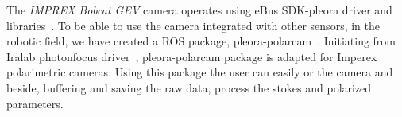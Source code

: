 The \textit{IMPREX Bobcat GEV} camera operates using eBus SDK-pleora driver and
libraries~\cite{eBus}. To be able to use the camera integrated with other
sensors, in the robotic field, we have created a ROS
package, pleora-polarcam~\cite{pleora_polarcam}.
Initiating from Iralab photonfocus driver~\cite{ira}, pleora-polarcam package
is adapted for Imperex polarimetric cameras.
Using this package the user can easily  or  the
camera and beside, buffering and saving the raw data, process the stokes and
polarized parameters.



